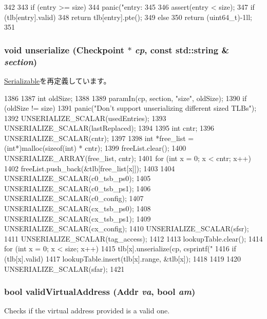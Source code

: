 \begin{DoxyCode}
342 {
343     if (entry >= size)
344         panic("entry: %
345 
346     assert(entry < size);
347     if (tlb[entry].valid)
348         return tlb[entry].pte();
349     else
350         return (uint64_t)-1ll;
351 }
\end{DoxyCode}
\hypertarget{classSparcISA_1_1TLB_af22e5d6d660b97db37003ac61ac4ee49}{
\subsubsection[{unserialize}]{\setlength{\rightskip}{0pt plus 5cm}void unserialize ({\bf Checkpoint} $\ast$ {\em cp}, \/  const std::string \& {\em section})}}
\label{classSparcISA_1_1TLB_af22e5d6d660b97db37003ac61ac4ee49}


\hyperlink{classSerializable_af100c4e9feabf3cd918619c88c718387}{Serializable}を再定義しています。


\begin{DoxyCode}
1386 {
1387     int oldSize;
1388 
1389     paramIn(cp, section, "size", oldSize);
1390     if (oldSize != size)
1391         panic("Don't support unserializing different sized TLBs\n");
1392     UNSERIALIZE_SCALAR(usedEntries);
1393     UNSERIALIZE_SCALAR(lastReplaced);
1394 
1395     int cntr;
1396     UNSERIALIZE_SCALAR(cntr);
1397 
1398     int *free_list = (int*)malloc(sizeof(int) * cntr);
1399     freeList.clear();
1400     UNSERIALIZE_ARRAY(free_list,  cntr);
1401     for (int x = 0; x < cntr; x++)
1402         freeList.push_back(&tlb[free_list[x]]);
1403 
1404     UNSERIALIZE_SCALAR(c0_tsb_ps0);
1405     UNSERIALIZE_SCALAR(c0_tsb_ps1);
1406     UNSERIALIZE_SCALAR(c0_config);
1407     UNSERIALIZE_SCALAR(cx_tsb_ps0);
1408     UNSERIALIZE_SCALAR(cx_tsb_ps1);
1409     UNSERIALIZE_SCALAR(cx_config);
1410     UNSERIALIZE_SCALAR(sfsr);
1411     UNSERIALIZE_SCALAR(tag_access);
1412 
1413     lookupTable.clear();
1414     for (int x = 0; x < size; x++) {
1415         tlb[x].unserialize(cp, csprintf("%
1416         if (tlb[x].valid)
1417             lookupTable.insert(tlb[x].range, &tlb[x]);
1418 
1419     }
1420     UNSERIALIZE_SCALAR(sfar);
1421 }
\end{DoxyCode}
\hypertarget{classSparcISA_1_1TLB_aa5cff14a14bcb47f10bb095035bd6290}{
\subsubsection[{validVirtualAddress}]{\setlength{\rightskip}{0pt plus 5cm}bool validVirtualAddress ({\bf Addr} {\em va}, \/  bool {\em am})}}
\label{classSparcISA_1_1TLB_aa5cff14a14bcb47f10bb095035bd6290}
Checks if the virtual address provided is a valid one. 


